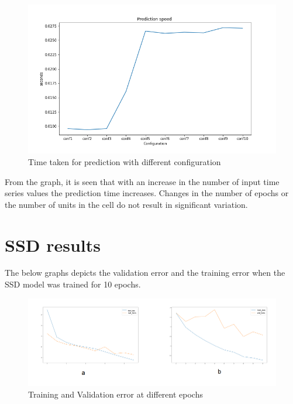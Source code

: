 \begin{figure}[H]
\includegraphics[scale=0.8]{time-taken-for-prediction.png}
\begin{center}
\caption{Time taken for prediction with different configuration}
\end{center}
\end{figure}

From the graph, it is seen that with an increase in the number of input time series values the prediction time increases. Changes in the number of epochs or the number of units in the cell do not result in significant variation.

\section{SSD results}
The below graphs depicts the validation error and the training error when the SSD model was trained for 10 epochs.

\begin{figure}[H]
\includegraphics[scale=0.7]{ssd-training}
\begin{center}
\caption{Training and Validation error at different epochs}
\label{fig:ssd-training}
\end{center}
\end{figure}

